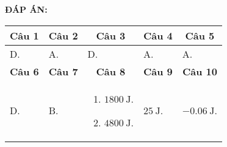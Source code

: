 \textbf{ĐÁP ÁN:}

\begin{longtable}[\textwidth]{|m{}|m{}|m{}|m{}|m{}|}
	\hline%
	\multicolumn{1}{|c}{\textbf{Câu 1}} &
	\multicolumn{1}{|c|}{\textbf{Câu 2}}& 
	\multicolumn{1}{c|}{\textbf{Câu 3}} &
	\multicolumn{1}{c|}{\textbf{Câu 4}} &
	\multicolumn{1}{c|}{\textbf{Câu 5}}  \\
	\hline
	D. &
	A. &
	D. &
	A. &
	A. \\
	\hline
	\multicolumn{1}{|c}{\textbf{Câu 6}} &
	\multicolumn{1}{|c|}{\textbf{Câu 7}}&  
	\multicolumn{1}{c|}{\textbf{Câu 8}} &
	\multicolumn{1}{c|}{\textbf{Câu 9}} &
	\multicolumn{1}{c|}{\textbf{Câu 10}}  \\
	\hline
	D. &
	B. &
	\begin{enumerate}[label=\alph*)]
		\item $\SI{1800}{\joule}$.
		\item $\SI{4800}{\joule}$.
	\end{enumerate} &
	$\SI{25}{\joule}$.&
	$\SI{-0,06}{\joule}$.
	\\
	\hline
\end{longtable}



